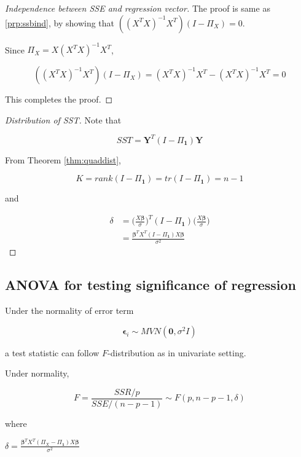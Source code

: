 \documentclass[]{book}
\theoremstyle{definition}
\theoremstyle{definition}
\theoremstyle{definition}
\theoremstyle{remark}
\let\BeginKnitrBlock\begin \let\EndKnitrBlock\end
\begin{document}
\BeginKnitrBlock{proof}[Independence between SSE and regression vector]
{}The proof is same as \ref{prp:ssbind}, by showing that \(((X^TX)^{-1}X^T)(I - \Pi_X) = 0\).

Since \(\Pi_X = X(X^TX)^{-1}X^T\),

\[((X^TX)^{-1}X^T)(I - \Pi_X) = (X^TX)^{-1}X^T - (X^TX)^{-1}X^T = 0\]

This completes the proof.
\EndKnitrBlock{proof}

\BeginKnitrBlock{proof}[Distribution of SST]
{}Note that

\[SST = \mathbf{Y}^T(I - \Pi_{\mathbf{1}})\mathbf{Y}\]

From Theorem \ref{thm:quaddist},

\[K = rank(I - \Pi_{\mathbf{1}}) = tr(I - \Pi_{\mathbf{1}}) = n - 1\]

and

\begin{equation*}
  \begin{split}
    \delta & = \bigg(\frac{X\boldsymbol\beta}{\sigma}\bigg)^T (I - \Pi_{\mathbf{1}}) \bigg(\frac{X\boldsymbol\beta}{\sigma}\bigg) \\
    & = \frac{\boldsymbol\beta^TX^T(I - \Pi_{\mathbf{1}})X\boldsymbol\beta}{\sigma^2}
  \end{split}
\end{equation*}
\EndKnitrBlock{proof}

\hypertarget{anova-for-testing-significance-of-regression-1}{%
\subsection{ANOVA for testing significance of regression}\label{anova-for-testing-significance-of-regression-1}}

Under the normality of error term

\[\boldsymbol\epsilon_i \sim MVN(\mathbf{0}, \sigma^2 I)\]

a test statistic can follow \(F\)-distribution as in univariate setting.

\BeginKnitrBlock{corollary}[F-test]
\protect\hypertarget{cor:ftest}{}{\label{cor:ftest} {} }Under normality,

\[F = \frac{SSR / p}{SSE / (n - p - 1)} \sim F(p, n - p - 1, \delta)\]

where

\(\delta = \frac{\boldsymbol\beta^TX^T(\Pi_X - \Pi_{\mathbf{1}})X\boldsymbol\beta}{\sigma^2}\)
\EndKnitrBlock{corollary}
\end{document}
